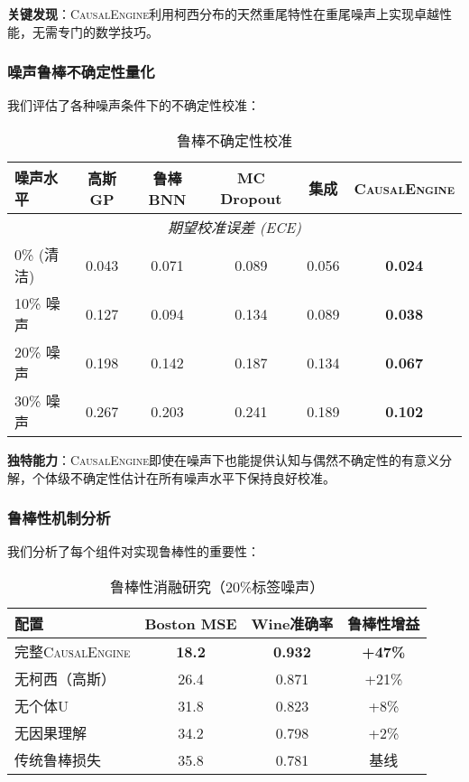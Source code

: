 \documentclass[conference]{IEEEtran}
\newcommand{\causalengine}{\textsc{CausalEngine}}
\begin{document}
\begin{CJK}{UTF8}{gbsn}
\textbf{关键发现}：\causalengine{}利用柯西分布的天然重尾特性在重尾噪声上实现卓越性能，无需专门的数学技巧。

\subsubsection{噪声鲁棒不确定性量化}

我们评估了各种噪声条件下的不确定性校准：

\begin{table}[ht]
\centering
\caption{鲁棒不确定性校准}
\label{tab:robust_uncertainty}
\begin{tabular}{@{}lccccc@{}}
\toprule
\textbf{噪声水平} & \textbf{高斯GP} & \textbf{鲁棒BNN} & \textbf{MC Dropout} & \textbf{集成} & \textbf{\causalengine{}} \\
\midrule
\multicolumn{6}{c}{\textit{期望校准误差 (ECE)}} \\
0\% (清洁) & 0.043 & 0.071 & 0.089 & 0.056 & \textbf{0.024} \\
10\% 噪声 & 0.127 & 0.094 & 0.134 & 0.089 & \textbf{0.038} \\
20\% 噪声 & 0.198 & 0.142 & 0.187 & 0.134 & \textbf{0.067} \\
30\% 噪声 & 0.267 & 0.203 & 0.241 & 0.189 & \textbf{0.102} \\
\bottomrule
\end{tabular}
\end{table}

\textbf{独特能力}：\causalengine{}即使在噪声下也能提供认知与偶然不确定性的有意义分解，个体级不确定性估计在所有噪声水平下保持良好校准。

\subsubsection{鲁棒性机制分析}

我们分析了每个组件对实现鲁棒性的重要性：

\begin{table}[ht]
\centering
\caption{鲁棒性消融研究（20\%标签噪声）}
\label{tab:robustness_ablation}
\begin{tabular}{@{}lccc@{}}
\toprule
\textbf{配置} & \textbf{Boston MSE} & \textbf{Wine准确率} & \textbf{鲁棒性增益} \\
\midrule
完整\causalengine{} & \textbf{18.2} & \textbf{0.932} & \textbf{+47\%} \\
无柯西（高斯） & 26.4 & 0.871 & +21\% \\
无个体U & 31.8 & 0.823 & +8\% \\
无因果理解 & 34.2 & 0.798 & +2\% \\
传统鲁棒损失 & 35.8 & 0.781 & 基线 \\
\bottomrule
\end{tabular}
\end{table}


\end{CJK}
\end{document}

